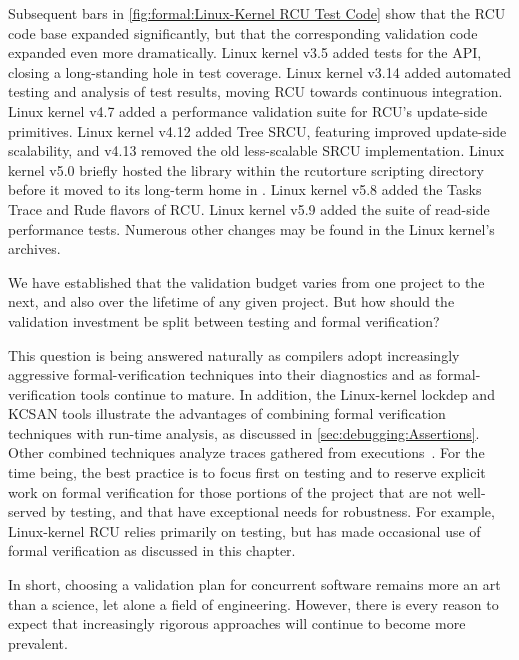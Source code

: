Subsequent bars in \cref{fig:formal:Linux-Kernel RCU Test Code} show
that the RCU code base expanded significantly, but that the
corresponding validation code expanded even more dramatically.
Linux kernel v3.5 added tests for the  API, closing
a long-standing hole in test coverage.
Linux kernel v3.14 added automated testing and analysis of test results,
moving RCU towards continuous integration.
Linux kernel v4.7 added a performance validation suite for RCU's update-side
primitives.
Linux kernel v4.12 added Tree SRCU, featuring improved update-side
scalability, and v4.13 removed the old less-scalable SRCU implementation.
Linux kernel v5.0 briefly hosted the  library within
the rcutorture scripting directory before it moved to its long-term
home in .
Linux kernel v5.8 added the Tasks Trace and Rude flavors of RCU\@.
Linux kernel v5.9 added the  suite of read-side performance
tests.
Numerous other changes may be found in the Linux kernel's  archives.

We have established that the validation budget varies from one project
to the next, and also over the lifetime of any given project.
But how should the validation investment be split between testing and
formal verification?

This question is being answered naturally as compilers adopt increasingly
aggressive formal-verification techniques into their diagnostics and
as formal-verification tools continue to mature.
In addition, the Linux-kernel lockdep and KCSAN tools illustrate the
advantages of combining formal verification techniques with run-time
analysis, as discussed in \cref{sec:debugging:Assertions}.
Other combined techniques analyze traces gathered from
executions~\cite{DanielBristot2019RTtrace}.
For the time being, the best practice is to focus first on testing and to
reserve explicit work on formal verification for those portions of the
project that are not well-served by testing, and that have exceptional
needs for robustness.
For example, Linux-kernel RCU relies primarily on testing, but has
made occasional use of formal verification as discussed in this chapter.

In short, choosing a validation plan for concurrent software remains
more an art than a science, let alone a field of engineering.
However, there is every reason to expect that increasingly rigorous
approaches will continue to become more prevalent.


